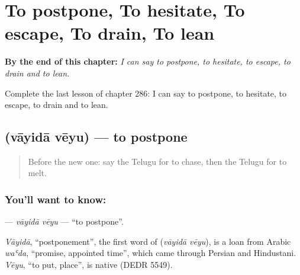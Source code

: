 
\chapter{To postpone, To hesitate, To escape, To drain, To lean}
\label{ch:te-to-postpone-to-hesitate-to-escape-to-drain-to-lean}

\begin{chapteropening}
\textbf{By the end of this chapter:} \emph{I can say to postpone, to hesitate, to escape, to drain and to lean.}

Complete the last lesson of chapter 286: I can say to postpone, to hesitate, to escape, to drain and to lean.
\end{chapteropening}

\section[\texorpdfstring{\te{వాయిదా} \te{వేయు} (vāyidā vēyu)}{వాయిదా వేయు (vāyidā vēyu)}]{  (vāyidā vēyu) — to postpone}

\label{lesson:TE-C286-vayida-veyu}



\begin{quote}
Before the new one: say the Telugu for to chase, then the Telugu for to melt.
\end{quote}

\subsection*{You'll want to know:  }
\textbf{ } — \emph{vāyidā vēyu} — \textquotedblleft{}to postpone\textquotedblright{}.

\begin{cousinweb}
\emph{Vāyidā}, \textquotedblleft{}postponement\textquotedblright{}, the first word of \textbf{ } (\emph{vāyidā vēyu}), is a loan from Arabic \emph{waʿda}, \textquotedblleft{}promise, appointed time\textquotedblright{}, which came through Persian and Hindustani. \emph{Vēyu}, \textquotedblleft{}to put, place\textquotedblright{}, is native (DEDR 5549).
\end{cousinweb}

